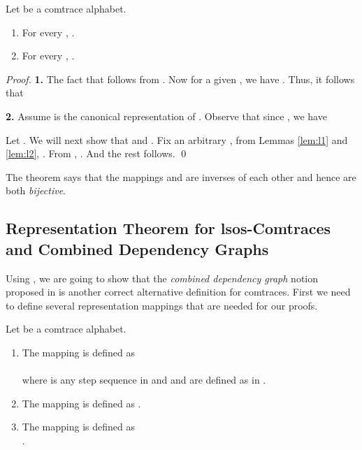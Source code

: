 \documentclass{llncs}
\begin{document}
\begin{theorem}  Let  be a comtrace alphabet.
\begin{enumerate}
\item For every , .
\item For every , .
\end{enumerate}
\label{theo:rep}
\end{theorem}

\begin{proof}\textbf{1. } The fact that  follows from . Now for a given ,  we have . Thus, it follows that
 

\textbf{2. }  Assume  is the canonical representation of . Observe that since , we have 

Let . We will next show that  and  . Fix an arbitrary , from Lemmas \ref{lem:l1} and \ref{lem:l2},  . From , . And the rest follows. \qed
\end{proof}

The theorem says that the mappings  and  are inverses of each other and hence are both \emph{bijective}. 


\subsection{Representation Theorem for lsos-Comtraces and Combined Dependency Graphs}
Using , we are going to show that the \emph{combined dependency graph} notion proposed in \cite{KK08} is another correct alternative definition for comtraces. First we need to define several  representation mappings  that are needed for our proofs.


\begin{definition} Let  be a comtrace alphabet. 
\begin{enumerate}
 \item The mapping   is defined as\smallskip\\
 \mbox{\hspace{3.5cm}}  \smallskip\\
where  is any step sequence in  and  and  are defined as in . 
 \item The mapping   is defined as  .
 \item The mapping   is defined as\smallskip\\
 \mbox{\hspace{3.2cm}}   . \EOD
\end{enumerate}
\label{def:drepmaps}
\end{definition}
\end{document}
